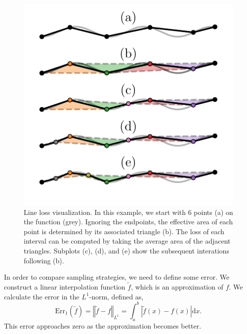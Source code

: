 \documentclass[english, twocolumn, 10pt, aps, superscriptaddress, floatfix, prb, citeautoscript]{revtex4-1}
\begin{document}
\begin{figure}
\centering
\includegraphics{figures/line_loss.pdf}
\caption{Line loss visualization.
In this example, we start with 6 points (a) on the function (grey).
Ignoring the endpoints, the effective area of each point is determined by its associated triangle (b).
The loss of each interval can be computed by taking the average area of the adjacent triangles.
Subplots (c), (d), and (e) show the subsequent interations following (b).\label{fig:line_loss}}
\end{figure}

In order to compare sampling strategies, we need to define some error.
We construct a linear interpolation function \(\tilde{f}\), which is an approximation of \(f\).
We calculate the error in the \(L^{1}\)-norm, defined as,
\[
\text{Err}_{1}(\tilde{f})=\left\Vert \tilde{f}-f\right\Vert _{L^{1}}=\int_{a}^{b}\left|\tilde{f}(x)-f(x)\right|\text{d}x.
\]
This error approaches zero as the approximation becomes better.
\end{document}
